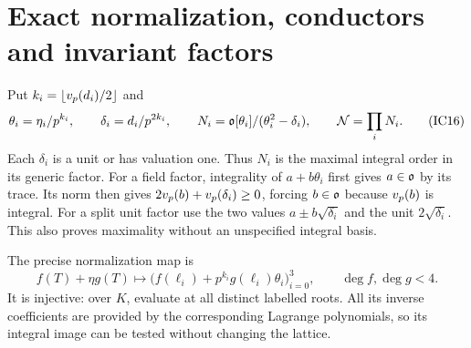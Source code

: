 \section{Exact normalization, conductors and invariant factors}
Put $k_i=\lfloor v_p(d_i)/2\rfloor$ and
\[
 \theta_i=\eta_i/p^{k_i},\qquad
 \delta_i=d_i/p^{2k_i},\qquad
 N_i=\mathfrak o[\theta_i]/(\theta_i^2-\delta_i),\qquad
 \mathcal N=\prod_iN_i.                                         \tag{IC16}
\]
Each $\delta_i$ is a unit or has valuation one. Thus $N_i$ is the maximal
integral order in its generic factor. For a field factor, integrality of
$a+b\theta_i$ first gives $a\in\mathfrak o$ by its trace. Its norm then gives
$2v_p(b)+v_p(\delta_i)\ge0$, forcing $b\in\mathfrak o$ because $v_p(b)$ is integral.
For a split unit factor use the two values $a\pm b\sqrt{\delta_i}$ and the
unit $2\sqrt{\delta_i}$. This also proves maximality without an unspecified
integral basis.

The precise normalization map is
\[
 f(T)+\eta g(T)\longmapsto
 \bigl(f(\ell_i)+p^{k_i}g(\ell_i)\theta_i\bigr)_{i=0}^3,
 \qquad \deg f,\deg g<4.                                \tag{IC17}
\]
It is injective: over $K$, evaluate at all distinct labelled roots.
All its inverse coefficients are provided by the corresponding Lagrange
polynomials, so its integral image can be tested without changing the lattice.

